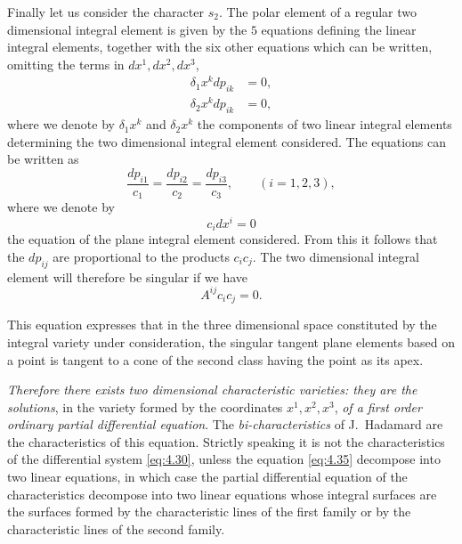 \documentclass[leqno,11pt]{book}
\numberwithin{equation}{chapter}
\theoremstyle{shape1}
\theoremstyle{shape0}
\theoremstyle{shape2}
\theoremstyle{definition}
\begin{document}
Finally let us consider the character $s_{2}$. The polar element of a regular two dimensional integral element is given by the $5$ equations defining the linear integral elements, together with the six other equations which can be written, omitting the terms in $dx^{1},dx^{2},dx^{3}$,
\begin{align*}
  \delta_{1}x^{k}dp_{ik}&=0,\\
  \delta_{2}x^{k}dp_{ik}&=0,
\end{align*}
where we denote by $\delta_{1}x^{k}$ and $\delta_{2}x^{k}$ the components of two linear integral elements determining the two dimensional integral element considered. The equations can be written as
\[
\frac{dp_{i1}}{c_{1}}=\frac{dp_{i2}}{c_{2}}=\frac{dp_{i3}}{c_{3}},\qquad(i=1,2,3),
\]
where we denote by 
\[
c_{i}dx^{i}=0
\]
the equation of the plane integral element considered. From this it follows that the $dp_{ij}$ are proportional to the products $c_{i}c_{j}$. The two dimensional integral element will therefore be singular if we have
\begin{equation}
  \label{eq:4.35}
  A^{ij}c_{i}c_{j}=0.
\end{equation}

This equation expresses that in the three dimensional space constituted by the integral variety under consideration, the singular tangent plane elements based on a point is tangent to a cone of the second class having the point as its apex.

\emph{Therefore there exists two dimensional characteristic varieties: they are the solutions}, in the variety formed by the coordinates $x^{1},x^{2},x^{3}$, \emph{of a first order ordinary partial differential equation}. The \emph{bi-characteristics} of J.~Hadamard are the characteristics of this equation. Strictly speaking it is not the characteristics of the differential system \eqref{eq:4.30}, unless the equation \eqref{eq:4.35} decompose into two linear equations, in which case the partial differential equation of the characteristics decompose into two linear equations whose integral surfaces are the surfaces formed  by the characteristic lines of the first family or by the characteristic lines of the second family.
\end{document}
